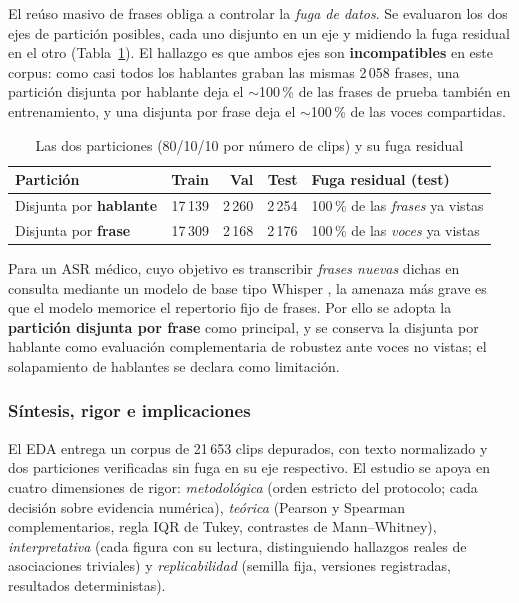 El re{\'u}so masivo de frases obliga a controlar la \emph{fuga de datos}. Se evaluaron los
dos ejes de partici{\'o}n posibles, cada uno disjunto en un eje y midiendo la fuga residual
en el otro (Tabla~\ref{tab:eda-particion}). El hallazgo es que ambos ejes son
\textbf{incompatibles} en este corpus: como casi todos los hablantes graban las mismas
2\,058 frases, una partici{\'o}n disjunta por hablante deja el $\sim$100\,\% de las frases
de prueba tambi{\'e}n en entrenamiento, y una disjunta por frase deja el $\sim$100\,\% de
las voces compartidas.

\begin{table}[H]
  \centering
  \caption{Las dos particiones (80/10/10 por n\'umero de clips) y su fuga residual}
  \label{tab:eda-particion}
  \small
  \begin{tabularx}{\linewidth}{@{}l r r r X@{}}
    \toprule
    Partici\'on & Train & Val & Test & Fuga residual (test) \\
    \midrule
    Disjunta por \textbf{hablante} & 17\,139 & 2\,260 & 2\,254 & 100\,\% de las \emph{frases} ya vistas \\
    Disjunta por \textbf{frase}    & 17\,309 & 2\,168 & 2\,176 & 100\,\% de las \emph{voces} ya vistas \\
    \bottomrule
  \end{tabularx}
\end{table}

Para un ASR m{\'e}dico, cuyo objetivo es transcribir \emph{frases nuevas} dichas en
consulta mediante un modelo de base tipo Whisper \parencite{radford2023whisper}, la
amenaza m{\'a}s grave es que el modelo memorice el repertorio fijo de frases. Por ello se
adopta la \textbf{partici{\'o}n disjunta por frase} como principal, y se conserva la
disjunta por hablante como evaluaci{\'o}n complementaria de robustez ante voces no vistas;
el solapamiento de hablantes se declara como limitaci{\'o}n.

\subsubsection{S\'intesis, rigor e implicaciones}
\label{sec:eda-sintesis}

El EDA entrega un corpus de 21\,653 clips depurados, con texto normalizado y dos
particiones verificadas sin fuga en su eje respectivo. El estudio se apoya en cuatro
dimensiones de rigor: \emph{metodol{\'o}gica} (orden estricto del protocolo; cada decisi{\'o}n
sobre evidencia num{\'e}rica), \emph{te{\'o}rica} (Pearson y Spearman complementarios, regla
IQR de Tukey, contrastes de Mann--Whitney), \emph{interpretativa} (cada figura con su lectura,
distinguiendo hallazgos reales de asociaciones triviales) y \emph{replicabilidad} (semilla
fija, versiones registradas, resultados deterministas).

